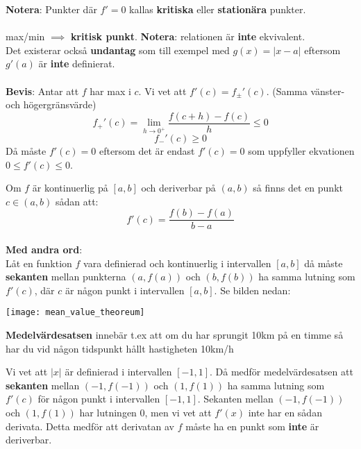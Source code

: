 \documentclass{report}
\begin{document}
\vspace{20pt}
{
\textbf{Notera}: Punkter där $ f' = 0 $ kallas \textbf{kritiska} eller \textbf{stationära} punkter.\\\\

max/min $ \implies  $ \textbf{kritisk punkt}. \textbf{Notera}: relationen är \textbf{inte} ekvivalent.\\
Det existerar också \textbf{undantag}  som till exempel med $ g(x) = |x-a| $ eftersom $ g'(a) $ är \textbf{inte} definierat.\\\\ 

\textbf{Bevis}: Antar att $ f $ har max i $ c $. Vi vet att $ f'(c) = f_\pm'(c) $. (Samma vänster- och högergränsvärde)
\begin{equation*}
f_+'(c) = \lim_{h \to 0^+} \frac{f(c+h)-f(c)}{h} \le 0
\end{equation*}
\begin{equation*}
f_-'(c) \ge 0
\end{equation*}
Då måste $ f'(c) = 0 $ eftersom det är endast $ f'(c) = 0 $ som uppfyller ekvationen $ 0 \le f'(c) \le 0 $.
}


\pagebreak
{}
{
	Om $ f $ är kontinuerlig på $ [a,b] $ och deriverbar på $ (a,b) $ så finns det en punkt $ c \in (a,b) $ sådan att:
\begin{equation*}
f'(c) = \frac{f(b)-f(a)}{b-a} 
\end{equation*}
\dotfill\\
\textbf{Med andra ord}:\\
	Låt en funktion $ f $ vara definierad och kontinuerlig i intervallen $ [a,b] $ då måste \textbf{sekanten} mellan punkterna $  (a, f(a)) $  och $(b, f(b)) $ ha samma lutning som $ f'(c) $, där $ c $ är någon punkt i intervallen $ [a,b] $. Se bilden nedan:   
\begin{center}
		\texttt{[image: mean\_value\_theoreum]}
\end{center}
}

\vspace{20pt}
\ex{}
{
\textbf{Medelvärdesatsen} innebär t.ex att om du har sprungit 10km på en timme så har du vid någon tidspunkt hållt hastigheten 10km/h
}

{
	Vi vet att $ |x| $ är definierad i intervallen $ [-1,1] $. Då medför medelvärdesatsen att \textbf{sekanten} mellan $ (-1,f(-1)) $ och $ (1,f(1)) $ ha samma lutning som $ f'(c) $ för någon punkt i intervallen $ [-1,1] $. Sekanten mellan $ (-1,f(-1)) $ och $ (1,f(1)) $ har lutningen 0, men vi vet att $ f'(x) $ inte har en sådan derivata. Detta medför att derivatan av $ f $ måste ha en punkt som \textbf{inte} är deriverbar.
}
\end{document}
